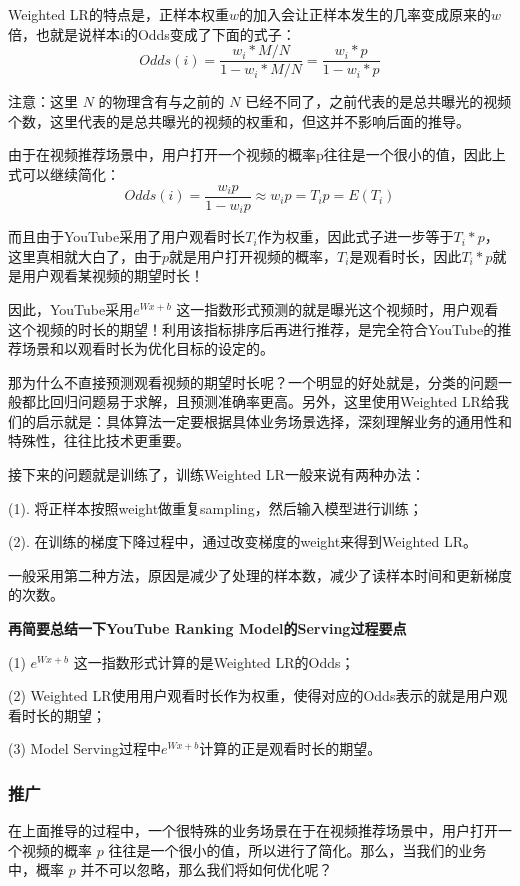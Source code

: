 \documentclass[12pt]{article}
\begin{document}
Weighted LR的特点是，正样本权重$w$的加入会让正样本发生的几率变成原来的$w$倍，也就是说样本i的Odds变成了下面的式子：
$$
Odds(i) = \frac{w_i * M/N}{ 1 - w_i*M/N} = \frac{w_i*p}{1 - w_i*p}
$$

\begin{framed}
注意：这里 $N$ 的物理含有与之前的 $N$ 已经不同了，之前代表的是总共曝光的视频个数，这里代表的是总共曝光的视频的权重和，但这并不影响后面的推导。
\end{framed}

由于在视频推荐场景中，用户打开一个视频的概率p往往是一个很小的值，因此上式可以继续简化：
$$
Odds(i) = \frac{w_ip}{1-w_ip} \approx w_ip = T_ip = E(T_i)
$$

而且由于YouTube采用了用户观看时长$T_i$作为权重，因此式子进一步等于$T_i*p$，这里真相就大白了，由于$p$就是用户打开视频的概率，$T_i$是观看时长，因此$T_i*p$就是用户观看某视频的期望时长！

因此，YouTube采用$e^{Wx+b}$ 这一指数形式预测的就是曝光这个视频时，用户观看这个视频的时长的期望！利用该指标排序后再进行推荐，是完全符合YouTube的推荐场景和以观看时长为优化目标的设定的。

\begin{framed}
那为什么不直接预测观看视频的期望时长呢？一个明显的好处就是，分类的问题一般都比回归问题易于求解，且预测准确率更高。另外，这里使用Weighted LR给我们的启示就是：具体算法一定要根据具体业务场景选择，深刻理解业务的通用性和特殊性，往往比技术更重要。
\end{framed}

\begin{framed}
接下来的问题就是训练了，训练Weighted LR一般来说有两种办法：

(1). 将正样本按照weight做重复sampling，然后输入模型进行训练；

(2). 在训练的梯度下降过程中，通过改变梯度的weight来得到Weighted LR。

一般采用第二种方法，原因是减少了处理的样本数，减少了读样本时间和更新梯度的次数。
\end{framed}

\textbf{再简要总结一下YouTube Ranking Model的Serving过程要点}

(1) $e^{Wx+b}$  这一指数形式计算的是Weighted LR的Odds；

(2) Weighted LR使用用户观看时长作为权重，使得对应的Odds表示的就是用户观看时长的期望；

(3) Model Serving过程中$e^{Wx+b}$计算的正是观看时长的期望。

\subsubsection{推广}
在上面推导的过程中，一个很特殊的业务场景在于在视频推荐场景中，用户打开一个视频的概率 $p$ 往往是一个很小的值，所以进行了简化。那么，当我们的业务中，概率 $p$ 并不可以忽略，那么我们将如何优化呢？
\end{document}
